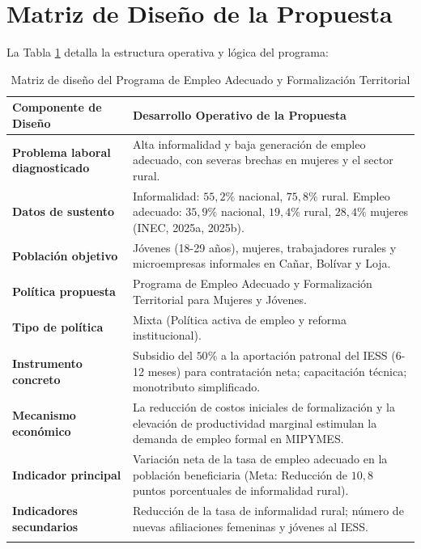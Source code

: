 \documentclass[10pt,]{article}
\begin{document}
\section{Matriz de Diseño de la
Propuesta}\label{matriz-de-diseuxf1o-de-la-propuesta}

La Tabla \ref{tbl:matriz} detalla la estructura operativa y lógica del
programa:

\begin{singlespace}
\begin{small}
\begin{longtable}{p{4.5cm} p{10.5cm}}
\caption{Matriz de diseño del Programa de Empleo Adecuado y Formalización Territorial} \label{tbl:matriz} \\
\toprule
\textbf{Componente de Diseño} & \textbf{Desarrollo Operativo de la Propuesta} \\ \midrule
\textbf{Problema laboral diagnosticado} & Alta informalidad y baja generación de empleo adecuado, con severas brechas en mujeres y el sector rural. \\ \addlinespace
\textbf{Datos de sustento} & Informalidad: $55,2\%$ nacional, $75,8\%$ rural. Empleo adecuado: $35,9\%$ nacional, $19,4\%$ rural, $28,4\%$ mujeres (INEC, 2025a, 2025b). \\ \addlinespace
\textbf{Población objetivo} & Jóvenes (18-29 años), mujeres, trabajadores rurales y microempresas informales en Cañar, Bolívar y Loja. \\ \addlinespace
\textbf{Política propuesta} & Programa de Empleo Adecuado y Formalización Territorial para Mujeres y Jóvenes. \\ \addlinespace
\textbf{Tipo de política} & Mixta (Política activa de empleo y reforma institucional). \\ \addlinespace
\textbf{Instrumento concreto} & Subsidio del $50\%$ a la aportación patronal del IESS (6-12 meses) para contratación neta; capacitación técnica; monotributo simplificado. \\ \addlinespace
\textbf{Mecanismo económico} & La reducción de costos iniciales de formalización y la elevación de productividad marginal estimulan la demanda de empleo formal en MIPYMES. \\ \addlinespace
\textbf{Indicador principal} & Variación neta de la tasa de empleo adecuado en la población beneficiaria (Meta: Reducción de $10,8$ puntos porcentuales de informalidad rural). \\ \addlinespace
\textbf{Indicadores secundarios} & Reducción de la tasa de informalidad rural; número de nuevas afiliaciones femeninas y jóvenes al IESS. \\ \addlinespace

\end{longtable}
\end{small}
\end{singlespace}
\end{document}
